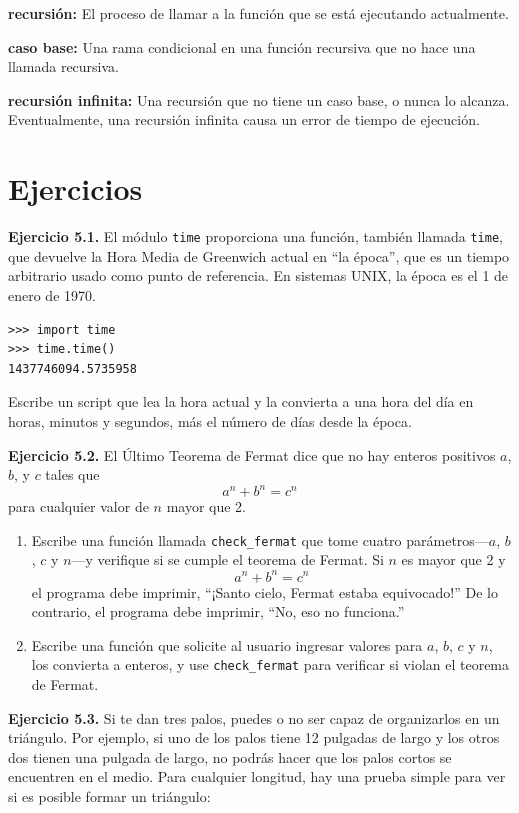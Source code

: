 \textbf{recursión:} El proceso de llamar a la función que se está ejecutando actualmente.

\textbf{caso base:} Una rama condicional en una función recursiva que no hace una llamada recursiva.

\textbf{recursión infinita:} Una recursión que no tiene un caso base, o nunca lo alcanza. Eventualmente, una recursión infinita causa un error de tiempo de ejecución.

\section{Ejercicios}

\textbf{Ejercicio 5.1.} El módulo \texttt{time} proporciona una función, también llamada \texttt{time}, que devuelve la Hora Media de Greenwich actual en ``la época'', que es un tiempo arbitrario usado como punto de referencia. En sistemas UNIX, la época es el 1 de enero de 1970.

\begin{lstlisting}
>>> import time
>>> time.time()
1437746094.5735958
\end{lstlisting}

Escribe un script que lea la hora actual y la convierta a una hora del día en horas, minutos y segundos, más el número de días desde la época.

\textbf{Ejercicio 5.2.} El Último Teorema de Fermat dice que no hay enteros positivos $a$, $b$, y $c$ tales que
$$a^n + b^n = c^n$$
para cualquier valor de $n$ mayor que 2.

\begin{enumerate}
\item Escribe una función llamada \texttt{check\_fermat} que tome cuatro parámetros---$a$, $b$, $c$ y $n$---y verifique si se cumple el teorema de Fermat. Si $n$ es mayor que 2 y
$$a^n + b^n = c^n$$
el programa debe imprimir, ``¡Santo cielo, Fermat estaba equivocado!'' De lo contrario, el programa debe imprimir, ``No, eso no funciona.''

\item Escribe una función que solicite al usuario ingresar valores para $a$, $b$, $c$ y $n$, los convierta a enteros, y use \texttt{check\_fermat} para verificar si violan el teorema de Fermat.
\end{enumerate}

\textbf{Ejercicio 5.3.} Si te dan tres palos, puedes o no ser capaz de organizarlos en un triángulo. Por ejemplo, si uno de los palos tiene 12 pulgadas de largo y los otros dos tienen una pulgada de largo, no podrás hacer que los palos cortos se encuentren en el medio. Para cualquier longitud, hay una prueba simple para ver si es posible formar un triángulo:

